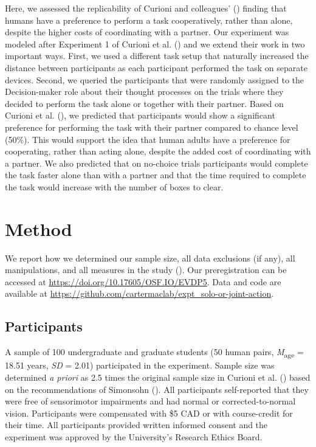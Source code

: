 \documentclass[
  man,
  floatsintext,
  longtable,
  nolmodern,
  notxfonts,
  notimes,
  mask,
  colorlinks=true,linkcolor=blue,citecolor=blue,urlcolor=blue]{apa7}
\begin{document}
Here, we assessed the replicability of Curioni and colleagues'
() finding that humans have a preference
to perform a task cooperatively, rather than alone, despite the higher
costs of coordinating with a partner. Our experiment was modeled after
Experiment 1 of Curioni et al. () and we
extend their work in two important ways. First, we used a different task
setup that naturally increased the distance between participants as each
participant performed the task on separate devices. Second, we queried
the participants that were randomly assigned to the Decision-maker role
about their thought processes on the trials where they decided to
perform the task alone or together with their partner. Based on Curioni
et al. (), we predicted that
participants would show a significant preference for performing the task
with their partner compared to chance level (50\%). This would support
the idea that human adults have a preference for cooperating, rather
than acting alone, despite the added cost of coordinating with a
partner. We also predicted that on no-choice trials participants would
complete the task faster alone than with a partner and that the time
required to complete the task would increase with the number of boxes to
clear.

\section{Method}\label{method}

We report how we determined our sample size, all data exclusions (if
any), all manipulations, and all measures in the study
(). Our preregistration
can be accessed at \url{https://doi.org/10.17605/OSF.IO/EVDP5}. Data and
code are available at
\url{https://github.com/cartermaclab/expt_solo-or-joint-action}.

\subsection{Participants}\label{participants}

A sample of 100 undergraduate and graduate students (50 human pairs,
\emph{M}\textsubscript{age} = 18.51 years, \emph{SD} = 2.01)
participated in the experiment. Sample size was determined \emph{a
priori} as 2.5 times the original sample size in Curioni et al.
() based on the recommendations of
Simonsohn (). All participants
self-reported that they were free of sensorimotor impairments and had
normal or corrected-to-normal vision. Participants were compensated with
\$5 CAD or with course-credit for their time. All participants provided
written informed consent and the experiment was approved by the
University's Research Ethics Board.
\end{document}
